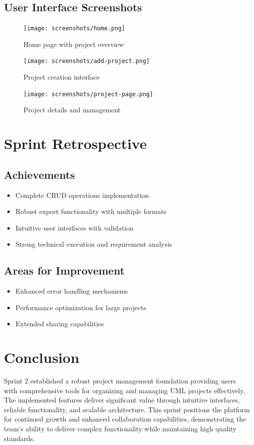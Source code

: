 \subsection{User Interface Screenshots}

\begin{figure}[H]
\centering
\texttt{[image: screenshots/home.png]}
\caption{Home page with project overview}
\label{fig:home_page}
\end{figure}

\begin{figure}[H]
\centering
\texttt{[image: screenshots/add-project.png]}
\caption{Project creation interface}
\label{fig:add_project}
\end{figure}

\begin{figure}[H]
\centering
\texttt{[image: screenshots/project-page.png]}
\caption{Project details and management}
\label{fig:project_page}
\end{figure}


\section{Sprint Retrospective}

\subsection{Achievements}
\begin{itemize}
    \item Complete CRUD operations implementation
    \item Robust export functionality with multiple formats
    \item Intuitive user interfaces with validation
    \item Strong technical execution and requirement analysis
\end{itemize}

\subsection{Areas for Improvement}
\begin{itemize}
    \item Enhanced error handling mechanisms
    \item Performance optimization for large projects
    \item Extended sharing capabilities
\end{itemize}

\section{Conclusion}

Sprint 2 established a robust project management foundation providing users with comprehensive tools for organizing and managing UML projects effectively. The implemented features deliver significant value through intuitive interfaces, reliable functionality, and scalable architecture. This sprint positions the platform for continued growth and enhanced collaboration capabilities, demonstrating the team's ability to deliver complex functionality while maintaining high quality standards.